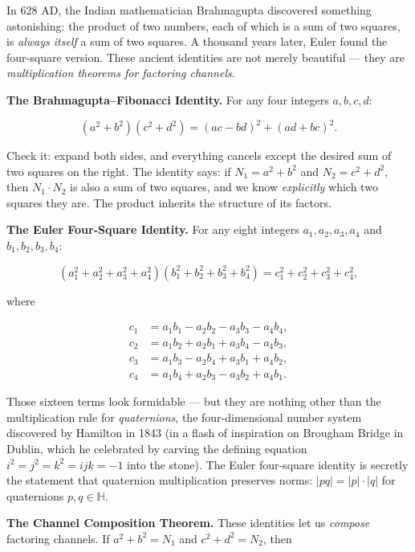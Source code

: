 \documentclass[11pt,openany]{book}
\theoremstyle{definition}
\theoremstyle{plain}
\theoremstyle{remark}
\begin{document}
In 628 AD, the Indian mathematician Brahmagupta discovered something astonishing: the product of two numbers, each of which is a sum of two squares, is \textit{always itself} a sum of two squares. A thousand years later, Euler found the four-square version. These ancient identities are not merely beautiful — they are \textit{multiplication theorems for factoring channels}.

\textbf{The Brahmagupta–Fibonacci Identity.} For any four integers $a, b, c, d$:

$$(a^2 + b^2)(c^2 + d^2) = (ac - bd)^2 + (ad + bc)^2.$$

Check it: expand both sides, and everything cancels except the desired sum of two squares on the right. The identity says: if $N_1 = a^2 + b^2$ and $N_2 = c^2 + d^2$, then $N_1 \cdot N_2$ is also a sum of two squares, and we know \textit{explicitly} which two squares they are. The product inherits the structure of its factors.

\textbf{The Euler Four-Square Identity.} For any eight integers $a_1, a_2, a_3, a_4$ and $b_1, b_2, b_3, b_4$:

$$(a_1^2 + a_2^2 + a_3^2 + a_4^2)(b_1^2 + b_2^2 + b_3^2 + b_4^2) = c_1^2 + c_2^2 + c_3^2 + c_4^2,$$

where

$$\begin{aligned}
c_1 &= a_1 b_1 - a_2 b_2 - a_3 b_3 - a_4 b_4, \\
c_2 &= a_1 b_2 + a_2 b_1 + a_3 b_4 - a_4 b_3, \\
c_3 &= a_1 b_3 - a_2 b_4 + a_3 b_1 + a_4 b_2, \\
c_4 &= a_1 b_4 + a_2 b_3 - a_3 b_2 + a_4 b_1.
\end{aligned}$$

Those sixteen terms look formidable — but they are nothing other than the multiplication rule for \textit{quaternions}, the four-dimensional number system discovered by Hamilton in 1843 (in a flash of inspiration on Brougham Bridge in Dublin, which he celebrated by carving the defining equation $i^2 = j^2 = k^2 = ijk = -1$ into the stone). The Euler four-square identity is secretly the statement that quaternion multiplication preserves norms: $|pq| = |p| \cdot |q|$ for quaternions $p, q \in \mathbb{H}$.

\textbf{The Channel Composition Theorem.} These identities let us \textit{compose} factoring channels. If $a^2 + b^2 = N_1$ and $c^2 + d^2 = N_2$, then
\end{document}
